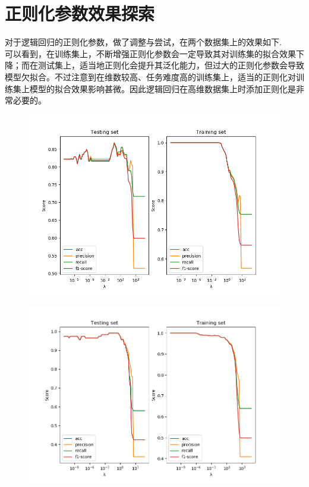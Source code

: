 \documentclass{SCIS2020cn}
\begin{document}
\section{正则化参数效果探索 }
对于逻辑回归的正则化参数，做了调整与尝试，在两个数据集上的效果如下.
\\可以看到，在训练集上，不断增强正则化参数会一定导致其对训练集的拟合效果下降；而在测试集上，适当地正则化会提升其泛化能力，但过大的正则化参数会导致模型欠拟合。不过注意到在维数较高、任务难度高的训练集上，适当的正则化对训练集上模型的拟合效果影响甚微。因此逻辑回归在高维数据集上时添加正则化是非常必要的。
\begin{figure}[!t]
    \centering
    \includegraphics[width=1.2\textwidth]{./fig/fig1.png}
    \label{fig1}
\end{figure}
\begin{figure}[!t]
    \centering
    \includegraphics[width=1.2\textwidth]{./fig/fig2.png}
    \label{fig2}
\end{figure}
\end{document}
